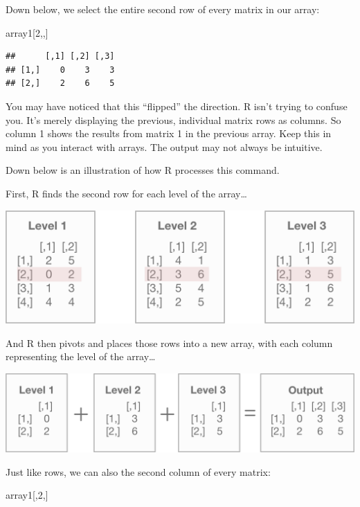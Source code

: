 \documentclass[
]{book}
\newenvironment{Shaded}{\begin{snugshade}}{\end{snugshade}}
\newcommand{\DecValTok}[1]{\textcolor[rgb]{0.00,0.00,0.81}{#1}}
\newcommand{\NormalTok}[1]{#1}
\begin{document}
\begin{center}
Down below, we select the entire second row of every matrix in our array:

\begin{Shaded}
\begin{Highlighting}[]
\NormalTok{array1[}\DecValTok{2}\NormalTok{,,]}
\end{Highlighting}
\end{Shaded}

\begin{verbatim}
##      [,1] [,2] [,3]
## [1,]    0    3    3
## [2,]    2    6    5
\end{verbatim}

You may have noticed that this ``flipped'' the direction. R isn't trying to confuse you. It's merely displaying the previous, individual matrix rows as columns. So column 1 shows the results from matrix 1 in the previous array. Keep this in mind as you interact with arrays. The output may not always be intuitive.

Down below is an illustration of how R processes this command.

First, R finds the second row for each level of the array\ldots{}

\begin{center}\includegraphics[width=0.5\linewidth]{1.36.1_Array_Row_Selection} \end{center}

And R then pivots and places those rows into a new array, with each column representing the level of the array\ldots{}

\begin{center}\includegraphics[width=0.65\linewidth]{1.36.2_Array_Row_Selection} \end{center}

Just like rows, we can also the second column of every matrix:

\begin{Shaded}
\begin{Highlighting}[]
\NormalTok{array1[,}\DecValTok{2}\NormalTok{,]}
\end{Highlighting}
\end{Shaded}


\end{center}
\end{document}
